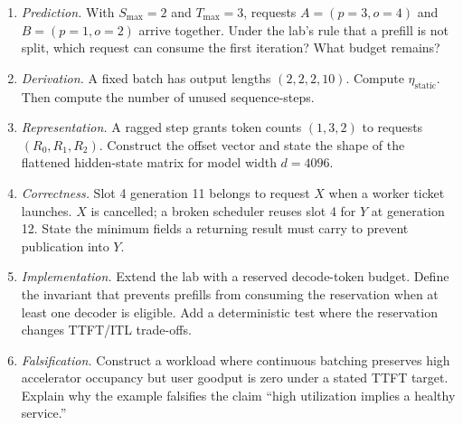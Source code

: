 \begin{enumerate}
\item \emph{Prediction.} With $S_{\max}=2$ and $T_{\max}=3$, requests
$A=(p=3,o=4)$ and $B=(p=1,o=2)$ arrive together. Under the lab's rule that a
prefill is not split, which request can consume the first iteration? What
budget remains?

\item \emph{Derivation.} A fixed batch has output lengths
$(2,2,2,10)$. Compute $\eta_{\mathrm{static}}$. Then compute the number of
unused sequence-steps.

\item \emph{Representation.} A ragged step grants token counts $(1,3,2)$ to
requests $(R_0,R_1,R_2)$. Construct the offset vector and state the shape of
the flattened hidden-state matrix for model width $d=4096$.

\item \emph{Correctness.} Slot 4 generation 11 belongs to request $X$ when a
worker ticket launches. $X$ is cancelled; a broken scheduler reuses slot 4
for $Y$ at generation 12. State the minimum fields a returning result must
carry to prevent publication into $Y$.

\item \emph{Implementation.} Extend the lab with a reserved decode-token
budget. Define the invariant that prevents prefills from consuming the
reservation when at least one decoder is eligible. Add a deterministic test
where the reservation changes TTFT/ITL trade-offs.

\item \emph{Falsification.} Construct a workload where continuous batching
preserves high accelerator occupancy but user goodput is zero under a stated
TTFT target. Explain why the example falsifies the claim ``high utilization
implies a healthy service.''
\end{enumerate}


